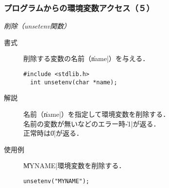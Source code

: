\documentclass{beamer}                 %
\begin{document}
\begin{frame}[fragile]
  \frametitle{プログラムからの環境変数アクセス（５）}
  \emph{削除（unsetenv関数）}
  \begin{description}
  \item [書式] 削除する変数の名前（\|name|）を与える．
\begin{lstlisting}[numbers=none]
  #include <stdlib.h>
  int unsetenv(char *name);
\end{lstlisting}
  \item [解説] 名前（\|name|）を指定して環境変数を削除する．\\
    名前の変数が無いなどのエラー時\|-1|が返る．\\
    正常時は\|0|が返る．
  \item [使用例] \|MYNAME|環境変数を削除する．
\begin{lstlisting}[numbers=none]
  unsetenv("MYNAME");
\end{lstlisting}
  \end{description}
  \vfill
\end{frame}
\end{document}
